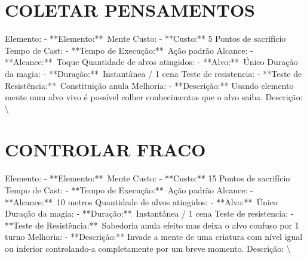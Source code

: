 \documentclass{article}%
\begin{document}
\section{COLETAR PENSAMENTOS}%
\label{sec:COLETARPENSAMENTOS}%
Elemento: {-} **Elemento:**~Mente\newline%
Custo: {-} **Custo:** 5 Pontos de sacrifício\newline%
Tempo de Cast: {-} **Tempo de Execução:**~Ação padrão\newline%
Alcance: {-} **Alcance:**~Toque\newline%
Quantidade de alvos atingidos: {-} **Alvo:**~Único\newline%
Duração da magia: {-} **Duração:**~Instantânea / 1 cena\newline%
Teste de resistencia: {-} **Teste de Resistência:**~Constituição anula\newline%
Melhoria: {-} **Descrição:** Usando elemento mente num alvo vivo é possível colher conhecimentos que o alvo saiba.\newline%
Descrição: \textbackslash{}

%
\section{CONTROLAR FRACO}%
\label{sec:CONTROLARFRACO}%
Elemento: {-} **Elemento:**~Mente\newline%
Custo: {-} **Custo:** 15 Pontos de sacrifício\newline%
Tempo de Cast: {-} **Tempo de Execução:**~Ação padrão\newline%
Alcance: {-} **Alcance:**~10 metros\newline%
Quantidade de alvos atingidos: {-} **Alvo:**~Único\newline%
Duração da magia: {-} **Duração:**~Instantânea / 1 cena\newline%
Teste de resistencia: {-} **Teste de Resistência:**~Sabedoria anula efeito mas deixa o alvo confuso por 1 turno\newline%
Melhoria: {-} **Descrição:** Invade a mente de uma criatura com nível igual ou inferior controlando{-}a completamente por um breve momento.\newline%
Descrição: \textbackslash{}

%
\end{document}
